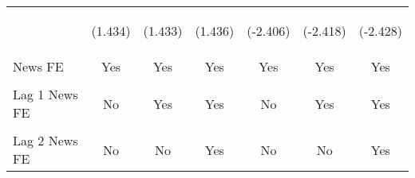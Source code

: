 \documentclass[border=0.2cm]{standalone}
\begin{document}
\begin{tabular}{lcccccc}
    \vspace{12pt}          & \begin{footnotesize}(1.434)\end{footnotesize}  & \begin{footnotesize}(1.433)\end{footnotesize}  & \begin{footnotesize}(1.436)\end{footnotesize}  & \begin{footnotesize}(-2.406)\end{footnotesize} & \begin{footnotesize}(-2.418)\end{footnotesize} & \begin{footnotesize}(-2.428)\end{footnotesize} \\
    News FE                & Yes                                            & Yes                                            & Yes                                            & Yes                                            & Yes                                            & Yes                                            \\
    \vspace{4pt}           &                                                &                                                &                                                &                                                &                                                &                                                \\
    Lag 1 News FE          & No                                             & Yes                                            & Yes                                            & No                                             & Yes                                            & Yes                                            \\
    \vspace{4pt}           &                                                &                                                &                                                &                                                &                                                &                                                \\
    Lag 2 News FE          & No                                             & No                                             & Yes                                            & No                                             & No                                             & Yes                                            \\

\end{tabular}
\end{document}
